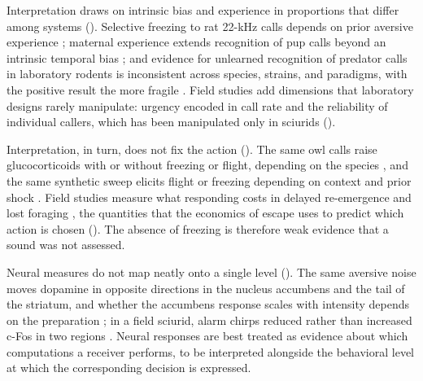 Interpretation draws on intrinsic bias and experience in proportions that differ among systems (). Selective freezing to rat 22-kHz calls depends on prior aversive experience \citep{KimEtAl2010}; maternal experience extends recognition of pup calls beyond an intrinsic temporal bias \citep{SchiavoEtAl2020}; and evidence for unlearned recognition of predator calls in laboratory rodents is inconsistent across species, strains, and paradigms, with the positive result the more fragile \citep{HendrieNeill1991,KindermannEtAl2009}.
Field studies add dimensions that laboratory designs rarely manipulate: urgency encoded in call rate \citep{BlumsteinArmitage1997} and the reliability of individual callers, which has been manipulated only in sciurids ().

Interpretation, in turn, does not fix the action (). The same owl calls raise glucocorticoids with or without freezing or flight, depending on the species \citep{EilamEtAl1999}, and the same synthetic sweep elicits flight or freezing depending on context and prior shock \citep{MongeauEtAl2003}. Field studies measure what responding costs in delayed re-emergence and lost foraging \citep{BaackSwitzer2000,JayneEtAl2015}, the quantities that the economics of escape uses to predict which action is chosen (). The absence of freezing is therefore weak evidence that a sound was not assessed.

Neural measures do not map neatly onto a single level (). The same aversive noise moves dopamine in opposite directions in the nucleus accumbens and the tail of the striatum, and whether the accumbens response scales with intensity depends on the preparation \citep{FuruyamaEtAl2026,GoedhoopEtAl2022}; in a field sciurid, alarm chirps reduced rather than increased c-Fos in two regions \citep{FreemanEtAl2020}. Neural responses are best treated as evidence about which computations a receiver performs, to be interpreted alongside the behavioral level at which the corresponding decision is expressed.

